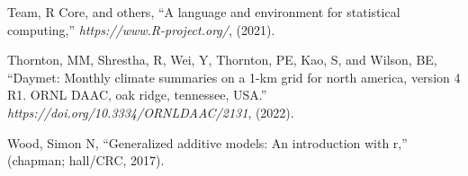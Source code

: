 \documentclass[
]{article}
\newlength{\cslhangindent}
\newenvironment{CSLReferences}[2] %
 {\begin{list}{}{%
  \setlength{\itemindent}{0pt}
  \setlength{\leftmargin}{0pt}
  \setlength{\parsep}{0pt}
  \ifodd #1
   \setlength{\leftmargin}{\cslhangindent}
   \setlength{\itemindent}{-1\cslhangindent}
  \fi
  \setlength{\itemsep}{#2\baselineskip}}}
 {\end{list}}
\begin{document}
\begin{CSLReferences}{1}{0}
Team, R Core, and others, {``A language and environment for statistical
computing,''} \emph{https://www.R-project.org/}, (2021).

Thornton, MM, Shrestha, R, Wei, Y, Thornton, PE, Kao, S, and Wilson, BE,
{``Daymet: Monthly climate summaries on a 1-km grid for north america,
version 4 R1. ORNL DAAC, oak ridge, tennessee, USA.''}
\emph{https://doi.org/10.3334/ORNLDAAC/2131}, (2022).

Wood, Simon N, {``Generalized additive models: An introduction with
r,''} (chapman; hall/CRC, 2017).

\end{CSLReferences}
\end{document}
